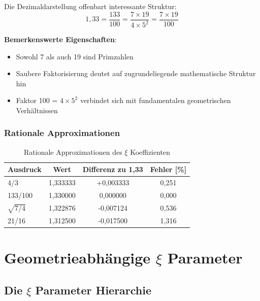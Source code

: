 	Die Dezimaldarstellung offenbart interessante Struktur:
	\begin{equation}
		1{,}33 = \frac{133}{100} = \frac{7 \times 19}{4 \times 5^2} = \frac{7 \times 19}{100}
		\label{eq:faktorisierung}
	\end{equation}
	
	\textbf{Bemerkenswerte Eigenschaften}:
	\begin{itemize}
		\item Sowohl 7 als auch 19 sind Primzahlen
		\item Saubere Faktorisierung deutet auf zugrundeliegende mathematische Struktur hin
		\item Faktor 100 = $4 \times 5^2$ verbindet sich mit fundamentalen geometrischen Verhältnissen
	\end{itemize}
	
	\subsubsection{Rationale Approximationen}
	\label{subsubsec:rationale_approximationen}
	
	\begin{table}[htbp]
		\centering
		\begin{tabular}{lccc}
			\toprule
			\textbf{Ausdruck} & \textbf{Wert} & \textbf{Differenz zu 1,33} & \textbf{Fehler [\%]} \\
			\midrule
			4/3 & 1{,}333333 & +0{,}003333 & 0{,}251 \\
			133/100 & 1{,}330000 & 0{,}000000 & 0{,}000 \\
			$\sqrt{7/4}$ & 1{,}322876 & -0{,}007124 & 0{,}536 \\
			21/16 & 1{,}312500 & -0{,}017500 & 1{,}316 \\
			\bottomrule
		\end{tabular}
		\caption{Rationale Approximationen des $\xi$ Koeffizienten}
		\label{tab:rationale_approximationen}
	\end{table}
	
	\section{Geometrieabhängige $\xi$ Parameter}
	\label{sec:geometrieabhaengige_xi}
	
	\subsection{Die $\xi$ Parameter Hierarchie}
	\label{subsec:xi_hierarchie}
	
